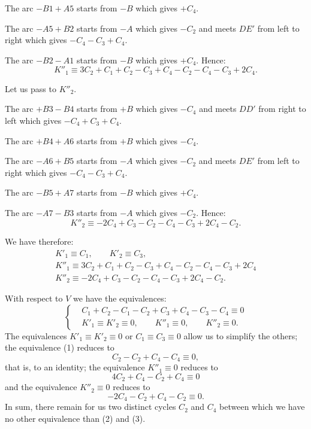 \documentclass{article}
\begin{document}
The arc $-B1 + A5$ starts from $-B$ which gives $+C_{4}$.

The arc $-A5 + B2$ starts from $-A$ which gives $-C_{2}$ and meets $DE'$ from left to right which gives $-C_{4} - C_{3} + C_{4}$.

The arc $-B2 - A1$ starts from $-B$ which gives $+C_{4}$.
Hence:
\[ K''_{1} \equiv 3C_{2} + C_{1} + C_{2} - C_{3} + C_{4} - C_{2} - C_{4} - C_{3} + 2C_{4}. \]


Let us pass to $K''_{2}$.

The arc $+B3 - B4$ starts from $+B$ which gives $-C_{4}$ and meets $DD'$ from right to left which gives $-C_{4} + C_{3} + C_{4}$.

The arc $+B4 + A6$ starts from $+B$ which gives $-C_{4}$.

The arc $-A6 + B5$ starts from $-A$ which gives $-C_{2}$ and meets $DE'$ from left to right which gives $-C_{4} - C_{3} + C_{4}$.

The arc $-B5 + A7$ starts from $-B$ which gives $+C_{4}$.

The arc $-A7 - B3$ starts from $-A$ which gives $-C_{2}$.
Hence:
\[ K''_{2} \equiv -2C_{4} + C_{3} - C_{2} - C_{4} - C_{3} + 2C_{4} - C_{2}. \]

We have therefore:
\[ \begin{gathered} K'_{1} \equiv C_{1}, \qquad K'_{2} \equiv C_{3},\\ K''_{1} \equiv 3C_{2} + C_{1} + C_{2} - C_{3} + C_{4} - C_{2} - C_{4} - C_{3} + 2C_{4}\\ K''_{2} \equiv -2C_{4} + C_{3} - C_{2} - C_{4} - C_{3} + 2C_{4} - C_{2}. \end{gathered} \]

With respect to $V$ we have the equivalences:
\[ \left\{ \begin{aligned} &C_{1} + C_{2} - C_{1} - C_{2} + C_{3} + C_{4} - C_{3} - C_{4} \equiv 0\\ &K'_{1} \equiv K'_{2} \equiv 0, \qquad K''_{1} \equiv 0, \qquad K''_{2} \equiv 0. \end{aligned} \right. \tag{1} \]
The equivalences $K'_{1} \equiv K'_{2} \equiv 0$ or $C_{1} \equiv C_{3} \equiv 0$ allow us to simplify the others; the equivalence (1) reduces to
\[ C_{2} - C_{2} + C_{4} - C_{4} \equiv 0, \]
that is, to an identity; the equivalence $K''_{1} \equiv 0$ reduces to
\[ 4C_{2} + C_{4} - C_{2} + C_{4} \equiv 0 \tag{2} \]
and the equivalence $K''_{2} \equiv 0$ reduces to
\[ -2C_{4} - C_{2} + C_{4} - C_{2} \equiv 0. \tag{3} \]
In sum, there remain for us two distinct cycles $C_{2}$ and $C_{4}$ between which we have no other equivalence than (2) and (3).
\end{document}
